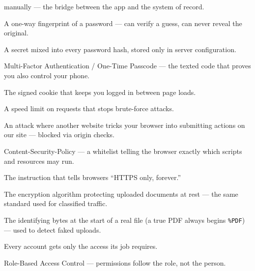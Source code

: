 \documentclass[11pt,letterpaper]{report}
\begin{document}
\begin{description}[leftmargin=1.4em,style=nextline]
  manually --- the bridge between the app and the system of record.
  \item[Hash] A one-way fingerprint of a password --- can verify a guess, can
  never reveal the original.
  \item[Pepper] A secret mixed into every password hash, stored only in server
  configuration.
  \item[MFA/OTP] Multi-Factor Authentication / One-Time Passcode --- the texted
  code that proves you also control your phone.
  \item[Session] The signed cookie that keeps you logged in between page loads.
  \item[Rate limit] A speed limit on requests that stops brute-force attacks.
  \item[CSRF] An attack where another website tricks your browser into
  submitting actions on our site --- blocked via origin checks.
  \item[CSP] Content-Security-Policy --- a whitelist telling the browser exactly
  which scripts and resources may run.
  \item[HSTS] The instruction that tells browsers ``HTTPS only, forever.''
  \item[AES-256-GCM] The encryption algorithm protecting uploaded documents at
  rest --- the same standard used for classified traffic.
  \item[Magic bytes] The identifying bytes at the start of a real file (a true
  PDF always begins \texttt{\%PDF}) --- used to detect faked uploads.
  \item[Least privilege] Every account gets only the access its job requires.
  \item[RBAC] Role-Based Access Control --- permissions follow the role, not the
  person.
\end{description}
\end{document}
